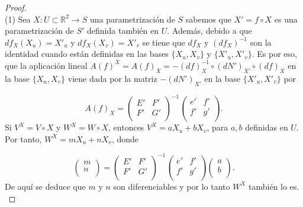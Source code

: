 \begin{proof}	
	${ }$\\
	
	(1)  Sea $X : U \subset \mathbb{R}^2 \to S$ una parametrización de $S$ sabemos que $X' = f \circ X$ es una parametrización de $S'$ definida también en $U$. Además, debido a que $df_X(X_u) = X'_{u}$ y $df_X(X_v) = X'_{v}$ se tiene que $df_X$ y $(df_X)^{-1}$ son la identidad cuando están definidas en las bases $\{X_u, X_v \}$ y $\{X'_{u}, X'_{v} \}$. Es por eso, que la aplicación lineal $A(f)^X = A(f)_X = -(df)^{-1}_{X} \circ (dN')_{X'} \circ (df)_X$ en la base $\{X_u, X_v \}$ viene dada por la matriz $-(dN')_{X'}$ en la base $\{X'_{u}, X'_{v} \}$ por
	
	\[
		A(f)_X = \left( {\begin{array}{cc}
			E' & F' \\
			F' & G' \\
			\end{array} } \right)^{-1}
		\left( {\begin{array}{cc}
			e' & f' \\
			f' & g' \\
			\end{array} } \right).
	\]
	${ }$\\
	
	Si $V^X = V \circ X$ y $W^X = W \circ X$, entonces $V^X = aX_u + bX_v$, para $a,b$ definidas en $U$. Por tanto, $W^X = mX_u + nX_v$, donde
	
	\[
		\left( {\begin{array}{c}
			m \\
			n \\
			\end{array} } \right)
		=
		\left( {\begin{array}{cc}
			E' & F' \\
			F' & G' \\
			\end{array} } \right)^{-1}
		\left( {\begin{array}{cc}
			e' & f' \\
			f' & g' \\
			\end{array} } \right)
		\left( {\begin{array}{c}
			a \\
			b \\
			\end{array} } \right).
	\]
	De aquí se deduce que $m$ y $n$ son diferenciables y por lo tanto $W^X$ también lo es.
	${ }$\\
	

\end{proof}

